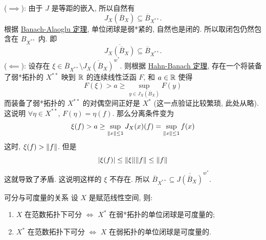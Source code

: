         \begin{prf}
            (\(\implies\)): 由于 \(J\) 是等距的嵌入, 所以自然有 
            \[J_X(\overline{B}_X)\subseteq \overline{B}_{X^{**}}.\]
            根据 \hyperref[thm:banach-alaoglu]{Banach-Alaoglu 定理}, 单位闭球是弱*紧的, 自然也是闭的. 所以取闭包仍然包含在 \(B_{X^{**}}\) 内. 即
            \[\overline{J_X(\overline{B}_X)}\subseteq \overline{B}_{X^{**}}.\]
            (\(\impliedby\)): 设存在 \(\xi\in\overline{B}_{X^{**}}\setminus\overline{J_X(\overline{B}_X)}^{w^*} \). 则根据 \hyperref[thm:hahn-banach]{Hahn-Banach 定理}, 存在一个将装备了弱*拓扑的 \(X^{**}\) 映到 \(\operatorname{\mathbb{R}}\) 的连续线性泛函 \(F\), 和 \(a\in\operatorname{\mathbb{R}}\) 使得 
            \[F(\xi)>a\geq\sup_{y\in J_X(\overline{B}_X)} F(y) \]
            而装备了弱*拓扑的 \(X^{**}\) 的对偶空间正好是 \(X^*\) (这一点验证比较繁琐, 此处从略). 这说明 \(\forall\eta\in X^{**}\), \(F(\eta)=\eta(f)\). 那么分离条件变为
            \[\xi(f)>a\geq\sup_{\norm{x}\leq 1} J_X(x)(f)=\sup_{\norm{x}\leq 1} f(x)\]
            这时, \(\xi(f)>\norm{f}\). 但是
            \[\abs{\xi(f)}\leq\norm{\xi}\norm{f}\leq\norm{f} \]
            这就导致了矛盾. 这说明这样的 \(\xi\) 不存在. 所以 \(\overline{B}_{X^{**}}\subseteq\overline{J(\overline{B}_{X})}^{w^*} \).

        \end{prf}

        \begin{thm}
            {可分与可度量的关系}
            设 \(X\) 是赋范线性空间, 则:
            \begin{enumerate}
                \item \(X\) 在范数拓扑下可分 \(\iff\) \(X^*\) 在弱*拓扑的单位闭球是可度量的;
                \item \(X^*\) 在范数拓扑下可分 \(\iff\) \(X\) 在弱拓扑的单位闭球是可度量的.
            \end{enumerate}
        \end{thm}

